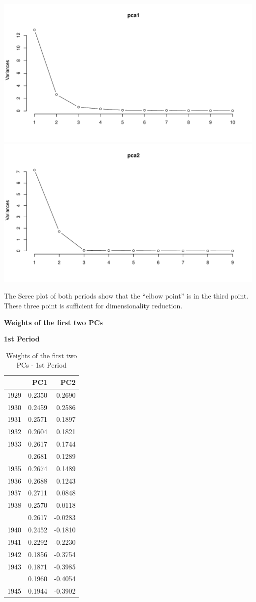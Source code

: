\documentclass[11pt,a4paper,]{article}
\begin{document}
\includegraphics[width=0.49\linewidth]{Assignment_2_ETF5500_files/figure-latex/screeplot-period1, figures-side-1} \includegraphics[width=0.49\linewidth]{Assignment_2_ETF5500_files/figure-latex/screeplot-period1, figures-side-2}

The Scree plot of both periods show that the ``elbow point'' is in the third point. These three point is sufficient for dimensionality reduction.

\textbf{Weights of the first two PCs}

\textbf{1st Period}

\begingroup\fontsize{10}{12}\selectfont

\begin{longtable}[t]{lrr}
\caption{\label{tab:weights-period1}Weights of the first two PCs - 1st Period}\\
\toprule
  & PC1 & PC2\\
\midrule
1929 & 0.2350 & 0.2690\\
1930 & 0.2459 & 0.2586\\
1931 & 0.2571 & 0.1897\\
1932 & 0.2604 & 0.1821\\
1933 & 0.2617 & 0.1744\\
\addlinespace
1934 & 0.2681 & 0.1289\\
1935 & 0.2674 & 0.1489\\
1936 & 0.2688 & 0.1243\\
1937 & 0.2711 & 0.0848\\
1938 & 0.2570 & 0.0118\\
\addlinespace
1939 & 0.2617 & -0.0283\\
1940 & 0.2452 & -0.1810\\
1941 & 0.2292 & -0.2230\\
1942 & 0.1856 & -0.3754\\
1943 & 0.1871 & -0.3985\\
\addlinespace
1944 & 0.1960 & -0.4054\\
1945 & 0.1944 & -0.3902\\
\bottomrule
\end{longtable}
\endgroup{}
\end{document}

